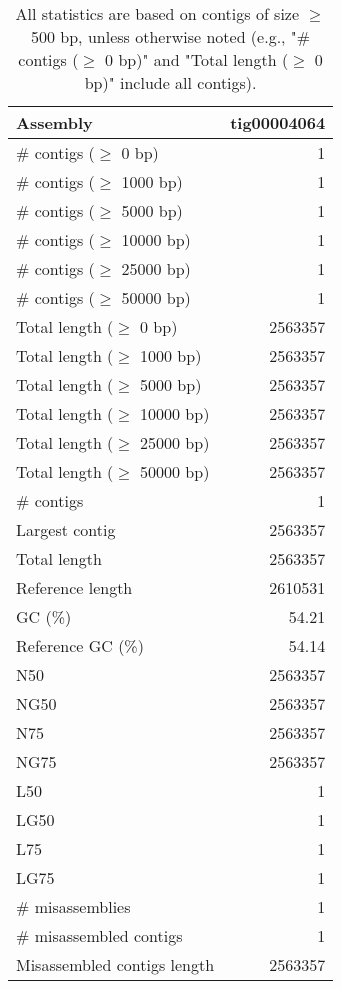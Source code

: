 \documentclass[12pt,a4paper]{article}
\begin{document}
\begin{table}[ht]
\begin{center}
\caption{All statistics are based on contigs of size $\geq$ 500 bp, unless otherwise noted (e.g., "\# contigs ($\geq$ 0 bp)" and "Total length ($\geq$ 0 bp)" include all contigs).}
\begin{tabular}{|l*{1}{|r}|}
\hline
Assembly & tig00004064 \\ \hline
\# contigs ($\geq$ 0 bp) & 1 \\ \hline
\# contigs ($\geq$ 1000 bp) & 1 \\ \hline
\# contigs ($\geq$ 5000 bp) & 1 \\ \hline
\# contigs ($\geq$ 10000 bp) & 1 \\ \hline
\# contigs ($\geq$ 25000 bp) & 1 \\ \hline
\# contigs ($\geq$ 50000 bp) & 1 \\ \hline
Total length ($\geq$ 0 bp) & 2563357 \\ \hline
Total length ($\geq$ 1000 bp) & 2563357 \\ \hline
Total length ($\geq$ 5000 bp) & 2563357 \\ \hline
Total length ($\geq$ 10000 bp) & 2563357 \\ \hline
Total length ($\geq$ 25000 bp) & 2563357 \\ \hline
Total length ($\geq$ 50000 bp) & 2563357 \\ \hline
\# contigs & 1 \\ \hline
Largest contig & 2563357 \\ \hline
Total length & 2563357 \\ \hline
Reference length & 2610531 \\ \hline
GC (\%) & 54.21 \\ \hline
Reference GC (\%) & 54.14 \\ \hline
N50 & 2563357 \\ \hline
NG50 & 2563357 \\ \hline
N75 & 2563357 \\ \hline
NG75 & 2563357 \\ \hline
L50 & 1 \\ \hline
LG50 & 1 \\ \hline
L75 & 1 \\ \hline
LG75 & 1 \\ \hline
\# misassemblies & 1 \\ \hline
\# misassembled contigs & 1 \\ \hline
Misassembled contigs length & 2563357 \\ \hline

\end{tabular}
\end{center}
\end{table}
\end{document}
